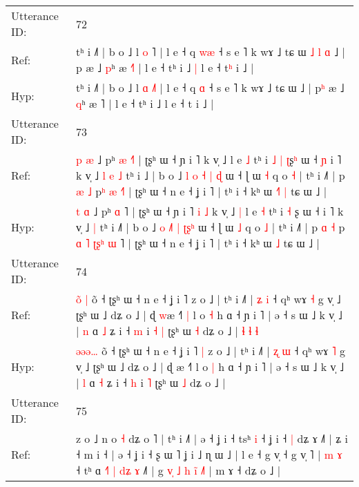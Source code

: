 \documentclass[10pt]{article}
\DeclareRobustCommand{\hl}[1]{{\textcolor{red}{#1}}}
\begin{document}
\begin{longtable}{ll}
\midrule
Utterance ID: & 72 \\
Ref: & tʰ i ˩˥ | b o ˩ l \hl{o} \hl{}˥ | l e ˧ q \hl{w}\hl{æ} ˧ s e ˥ k wɤ ˩ tɕ ɯ\hl{ }\hl{˩}\hl{ }\hl{l}\hl{ }\hl{ɑ} ˩ | p\hl{} æ ˩ \hl{p}ʰ æ \hl{˧}˥ | l e ˧ tʰ i ˩\hl{ }\hl{|} l e ˧ t\hl{ʰ} i ˩ |
 \\
Hyp: & tʰ i ˩˥ | b o ˩ l \hl{ɑ} \hl{˩}˥ | l e ˧ q \hl{}\hl{ɑ} ˧ s e ˥ k wɤ ˩ tɕ ɯ\hl{}\hl{}\hl{}\hl{}\hl{}\hl{} ˩ | p\hl{ʰ} æ ˩ \hl{q}ʰ æ \hl{}˥ | l e ˧ tʰ i ˩\hl{}\hl{} l e ˧ t\hl{} i ˩ |
 \\
\midrule
Utterance ID: & 73 \\
Ref: & \hl{p} \hl{æ} ˩ pʰ \hl{æ} \hl{˧}˥ | ʈʂʰ ɯ ˧ ɲ i ˥\hl{}\hl{}\hl{}\hl{} k v̩ ˩\hl{}\hl{} l e \hl{˩} tʰ i\hl{ }\hl{˩} \hl{|} \hl{ʈ}ʂ\hl{ʰ} ɯ ˧\hl{ }\hl{ɲ} i ˥ k v̩ ˩\hl{ }\hl{l}\hl{ }\hl{e} \hl{˩} tʰ i ˩\hl{} | b o ˩ \hl{l} \hl{}\hl{o} \hl{˧} \hl{|}\hl{ }\hl{ɖ} ɯ ˧ ɭ ɯ \hl{˧} q o \hl{˧} | tʰ i ˩˥ | p \hl{æ} \hl{˩} p\hl{}\hl{}\hl{}\hl{ʰ} \hl{}\hl{}\hl{æ} \hl{}\hl{˧}˥ | ʈʂʰ ɯ ˧ n e ˧ ʝ i ˥ | tʰ i ˧ kʰ ɯ\hl{ }\hl{˧}\hl{˥} \hl{|} tɕ ɯ ˩ |
 \\
Hyp: & \hl{t} \hl{ɑ} ˩ pʰ \hl{ɑ} \hl{}˥ | ʈʂʰ ɯ ˧ ɲ i ˥\hl{ }\hl{i}\hl{ }\hl{˩} k v̩ ˩\hl{ }\hl{|} l e \hl{˧} tʰ i\hl{}\hl{} \hl{˧} \hl{}ʂ\hl{} ɯ ˧\hl{}\hl{} i ˥ k v̩ ˩\hl{}\hl{}\hl{}\hl{} \hl{|} tʰ i ˩\hl{˥} | b o ˩ \hl{o} \hl{˩}\hl{˥} \hl{|} \hl{ʈ}\hl{ʂ}\hl{ʰ} ɯ ˧ ɭ ɯ \hl{˩} q o \hl{˩} | tʰ i ˩˥ | p \hl{ɑ} \hl{˧} p\hl{ }\hl{ɑ}\hl{ }\hl{˥} \hl{ʈ}\hl{ʂ}\hl{ʰ} \hl{ɯ}\hl{ }˥ | ʈʂʰ ɯ ˧ n e ˧ ʝ i ˥ | tʰ i ˧ kʰ ɯ\hl{}\hl{}\hl{} \hl{˩} tɕ ɯ ˩ |
 \\
\midrule
Utterance ID: & 74 \\
Ref: & \hl{o}\hl{̃}\hl{ }\hl{|} õ ˧ ʈʂʰ ɯ ˧ n e ˧ ʝ i ˥\hl{}\hl{} z o ˩ | tʰ i ˩˥ | \hl{ʑ} \hl{i} ˧ qʰ wɤ \hl{˧} g v̩ ˩ ʈʂʰ ɯ ˩ dʑ o ˩ | ɖ \hl{w}æ ˧˥\hl{ }\hl{|} l o \hl{˧} h ɑ ˧ ɲ i ˥ | ə ˧ s ɯ ˩ k v̩ ˩ | \hl{n} ɑ \hl{˩} ʑ i ˧ \hl{m} i\hl{ }\hl{˧} \hl{|} ʈʂʰ ɯ \hl{˧} dʑ o ˩ |\hl{ }\hl{ɬ}\hl{ }\hl{ɬ}\hl{ }\hl{ɬ}
 \\
Hyp: & \hl{ə}\hl{ə}\hl{ə}\hl{…} õ ˧ ʈʂʰ ɯ ˧ n e ˧ ʝ i ˥\hl{ }\hl{|} z o ˩ | tʰ i ˩˥ | \hl{ʐ} \hl{ɯ} ˧ qʰ wɤ \hl{˥} g v̩ ˩ ʈʂʰ ɯ ˩ dʑ o ˩ | ɖ \hl{}æ ˧˥\hl{}\hl{} l o \hl{|} h ɑ ˧ ɲ i ˥ | ə ˧ s ɯ ˩ k v̩ ˩ | \hl{l} ɑ \hl{˧} ʑ i ˧ \hl{h} i\hl{}\hl{} \hl{˥} ʈʂʰ ɯ \hl{˩} dʑ o ˩ |\hl{}\hl{}\hl{}\hl{}\hl{}\hl{}
 \\
\midrule
Utterance ID: & 75 \\
Ref: & z o ˩ n o \hl{˧} dʑ o ˥ | tʰ i ˩˥ | ə ˧ ʝ i ˧ tsʰ \hl{i} ˧ ʝ i ˧\hl{ }\hl{|} dʑ ɤ ˩\hl{˥} | ʑ i ˧ m i ˧ | ə ˧ ʝ i ˧ ʂ ɯ ˥ ʝ i ˩ ɳ ɯ ˩ | l e ˧ g v̩ ˧ g v̩ ˥ | \hl{m} \hl{ɤ} ˧ tʰ ɑ \hl{˧}˥\hl{ }\hl{|} \hl{d}\hl{ʑ} \hl{ɤ} ˩˥ | g\hl{ }\hl{v}\hl{̩} \hl{˩} \hl{h} \hl{i}\hl{̃} \hl{˩}\hl{˥} | m ɤ ˧ dʑ o ˩ |

\end{longtable}
\end{document}
